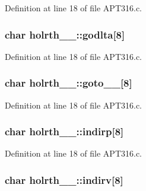 Definition at line 18 of file A\+P\+T316.\+c.

\subsubsection[{\texorpdfstring{godlta}{godlta}}]{\setlength{\rightskip}{0pt plus 5cm}char holrth\+\_\+\_\+\+::godlta\mbox{[}8\mbox{]}}\hypertarget{structholrth__1___ac35da7076f67b1c539c94c1731c78345}{}\label{structholrth__1___ac35da7076f67b1c539c94c1731c78345}


Definition at line 18 of file A\+P\+T316.\+c.

\subsubsection[{\texorpdfstring{goto\+\_\+\+\_\+}{goto__}}]{\setlength{\rightskip}{0pt plus 5cm}char holrth\+\_\+\_\+\+::goto\+\_\+\+\_\+\mbox{[}8\mbox{]}}\hypertarget{structholrth__1___a3e38dfe5d4be16968bad72a77e28af83}{}\label{structholrth__1___a3e38dfe5d4be16968bad72a77e28af83}


Definition at line 18 of file A\+P\+T316.\+c.

\subsubsection[{\texorpdfstring{indirp}{indirp}}]{\setlength{\rightskip}{0pt plus 5cm}char holrth\+\_\+\_\+\+::indirp\mbox{[}8\mbox{]}}\hypertarget{structholrth__1___accf4d56d20f16cba29fc5ccdcf6b4f83}{}\label{structholrth__1___accf4d56d20f16cba29fc5ccdcf6b4f83}


Definition at line 18 of file A\+P\+T316.\+c.

\subsubsection[{\texorpdfstring{indirv}{indirv}}]{\setlength{\rightskip}{0pt plus 5cm}char holrth\+\_\+\_\+\+::indirv\mbox{[}8\mbox{]}}\hypertarget{structholrth__1___ae20c851f7f49813c20e15709a3f3b10b}{}\label{structholrth__1___ae20c851f7f49813c20e15709a3f3b10b}


